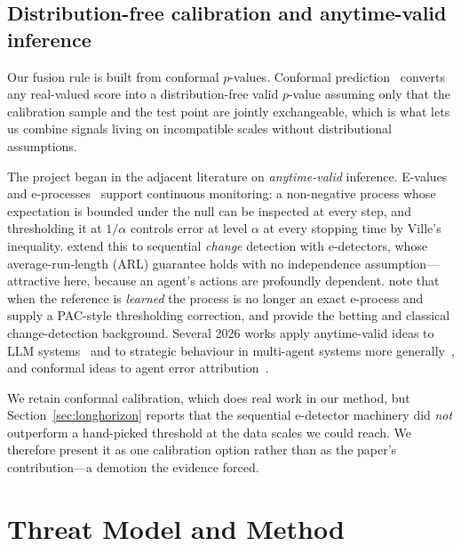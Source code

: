 \documentclass[preprint,12pt,authoryear]{elsarticle}
\theoremstyle{definition}
\begin{document}
\subsection{Distribution-free calibration and anytime-valid inference}

Our fusion rule is built from conformal $p$-values. Conformal
prediction~\citep{vovk2022algorithmic} converts any real-valued score into a
distribution-free valid $p$-value assuming only that the calibration sample and
the test point are jointly exchangeable, which is what lets us combine signals living on incompatible scales
without distributional assumptions.

The project began in the adjacent literature on \emph{anytime-valid} inference.
E-values and e-processes~\citep{vovk2021evalues,ramdas2023gametheoretic,
grunwald2024safetesting} support continuous monitoring: a non-negative process
whose expectation is bounded under the null can be inspected at every step, and
thresholding it at $1/\alpha$ controls error at level $\alpha$ at every stopping
time by Ville's inequality. \citet{shin2023edetectors} extend this to sequential
\emph{change} detection with e-detectors, whose average-run-length (ARL) guarantee
holds with no independence assumption---attractive here, because an agent's
actions are profoundly dependent. \citet{sadhuka2025evaluator} note that when the
reference is \emph{learned} the process is no longer an exact e-process and supply
a PAC-style thresholding correction, and
\citet{waudbysmith2023betting,page1954cusum,lorden1971procedures} provide the
betting and classical change-detection background.
Several 2026 works apply anytime-valid ideas to LLM
systems~\citep{xie2026sequential,li2026whodrifted} and to strategic behaviour in
multi-agent systems more generally~\citep{gauthier2026strategic}, and conformal
ideas to agent error attribution~\citep{feng2026conformalattribution}.

We retain conformal calibration, which does real work in our method, but
Section~\ref{sec:longhorizon} reports that the sequential e-detector machinery
did \emph{not} outperform a hand-picked threshold at the data scales we could
reach. We therefore present it as one calibration option rather than as the
paper's contribution---a demotion the evidence forced.

\section{Threat Model and Method}\label{sec:setup}
\end{document}

